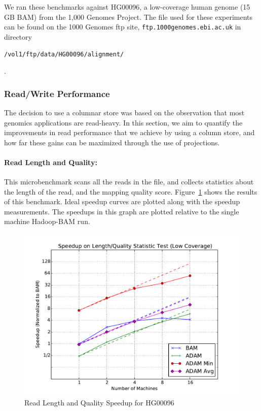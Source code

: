 \documentclass[10pt,twocolumn]{article}
\theoremstyle{plain}
\begin{document}
We ran these benchmarks against HG00096, a low-coverage human genome (15 GB
BAM) from the 1,000 Genomes Project. The file used for these experiments can be found on the 1000 Genomes ftp site, \texttt{ftp.1000genomes.ebi.ac.uk} in directory 
\begin{small}\texttt{/vol1/ftp/data/HG00096/alignment/}\end{small}.

\subsubsection{Read/Write Performance}
\label{sec:read-write-performance}

The decision to use a columnar store was based on the observation that most genomics applications are read-heavy. In this section,
we aim to quantify the improvements in read performance that we achieve by using a column store, and how far these gains can be
maximized through the use of projections.

\paragraph{Read Length and Quality:}
\label{sec:read-length-and-quality}

This microbenchmark scans all the reads in the file, and collects statistics about the length of the read, and the mapping quality score. Figure~\ref{fig:length-quality} shows
the results of this benchmark. Ideal speedup curves are plotted along with the speedup measurements. The speedups in this graph are plotted relative to the single machine Hadoop-BAM run.

\begin{figure}[h]
\begin{center}
\includegraphics[width=\linewidth]{microbenchmarks/length_and_quality_low_coverage.pdf}
\end{center}
\caption{Read Length and Quality Speedup for HG00096}
\label{fig:length-quality}
\end{figure}
\end{document}
